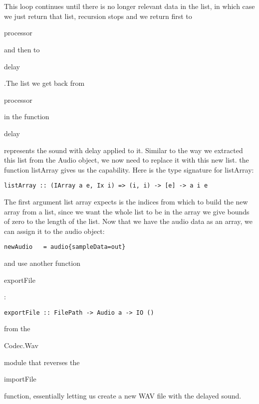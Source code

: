 \documentclass[12pt]{article}
\begin{document}
\\ \\
This loop continues until there is no longer relevant data in the list, in which case we just return that list, recursion stops and we return first to \begin{tt}processor\end{tt} and then to \begin{tt}delay\end{tt}.The list we get back from \begin{tt}processor\end{tt} in the function \begin{tt}delay\end{tt} represents the sound with delay applied to it. Similar to the way we extracted this list from the Audio object, we now need to replace it with this new list. the function listArray gives us the capability. Here is the type signature for listArray:
\begin{verbatim}
listArray :: (IArray a e, Ix i) => (i, i) -> [e] -> a i e
\end{verbatim}
The first argument list array expects is the indices from which to build the new array from a list, since we want the whole list to be in the array we give bounds of zero to the length of the list. Now that we have the audio data as an array, we can assign it to the audio object:
\begin{verbatim}
newAudio   = audio{sampleData=out}
\end{verbatim}
and use another function \begin{tt}exportFile\end{tt}:
\begin{verbatim}
exportFile :: FilePath -> Audio a -> IO ()
\end{verbatim}
from the \begin{tt}Codec.Wav\end{tt} module that reverses the \begin{tt}importFile\end{tt} function, essentially letting us create a new WAV file with the delayed sound.
\end{document}
